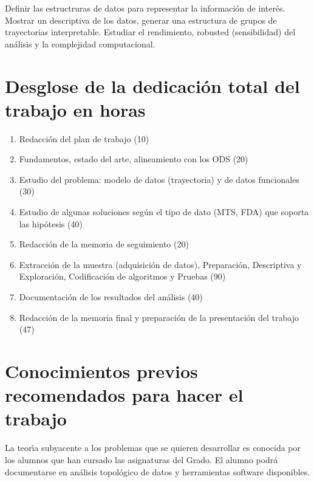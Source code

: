 Definir las estructruras de datos para representar la información de interés.
Mostrar un descriptiva de los datos, generar una estructura de grupos de trayectorias interpretable.
Estudiar el rendimiento, robusted (sensibilidad) del análisis y la complejidad computacional.


\section{Desglose de la dedicación total del trabajo en horas}

\begin{enumerate}

\item  Redacción del plan de trabajo (10)

\item  Fundamentos, estado del arte, alineamiento con los ODS  (20)

\item  Estudio del problema: modelo de datos (trayectoria) y de datos funcionales (30)

\item  Estudio de algunas soluciones seg\'un el tipo de dato (MTS, FDA) que soporta las hipótesis (40)

\item  Redacci\'on de la memoria de seguimiento (20)

\item  Extracción de la muestra (adquisición de datos), Preparación,
Descriptiva y Exploración, Codificaci\'on de algoritmos y Pruebas (90)

\item  Documentaci\'on de los resultados del an\'alisis (40)

\item  Redacci\'on de la memoria final y preparaci\'on de la presentación del trabajo (47)

\end{enumerate}

\section{Conocimientos previos recomendados para hacer el trabajo}

La teor\'{\i}a subyacente a los problemas que se quieren desarrollar es conocida por
los alumnos que han cursado las asignaturas del Grado.
El alumno podrá documentarse en análisis topológico de datos y herramientas software disponibles.

